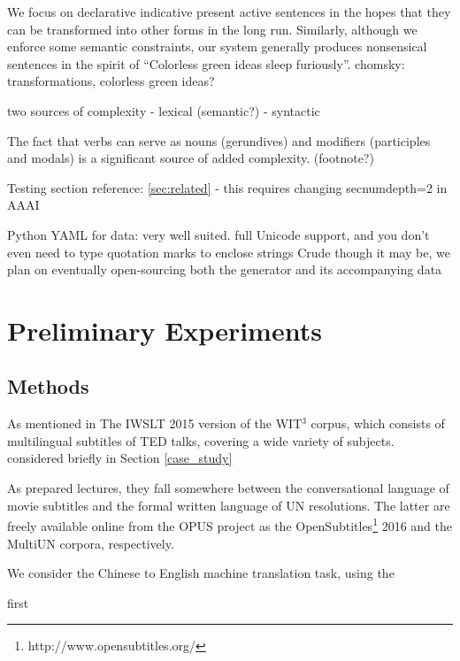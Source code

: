 We focus on declarative indicative present active sentences in the hopes that they can be transformed into other forms in the long run.
Similarly, although we enforce some semantic constraints, our system generally produces nonsensical sentences in the spirit of ``Colorless green ideas sleep furiously''.
chomsky: transformations, colorless green ideas? 


two sources of complexity
- lexical (semantic?)
- syntactic 

The fact that verbs can serve as nouns (gerundives) and modifiers (participles and modals) is a significant source of added complexity. (footnote?)

Testing section reference: \ref{sec:related} - this requires changing secnumdepth=2 in AAAI

Python
YAML for data: very well suited. full Unicode support, and you don't even need to type quotation marks to enclose strings
Crude though it may be, we plan on eventually open-sourcing both the generator and its accompanying data





\section{Preliminary Experiments}
\label{experiments}

\subsection{Methods}
As mentioned in 
The IWSLT 2015 version of the WIT$^3$ corpus, which consists of multilingual subtitles of TED talks, covering a wide variety of subjects. 
considered briefly in Section \ref{case_study}

As prepared lectures, they fall somewhere between the conversational language of movie subtitles and the formal written language of UN resolutions.
The latter are freely available online from the OPUS project  as the OpenSubtitles\footnote{http://www.opensubtitles.org/} 2016  and the MultiUN  corpora, respectively.

We consider the Chinese to English machine translation task, using the 

first 

